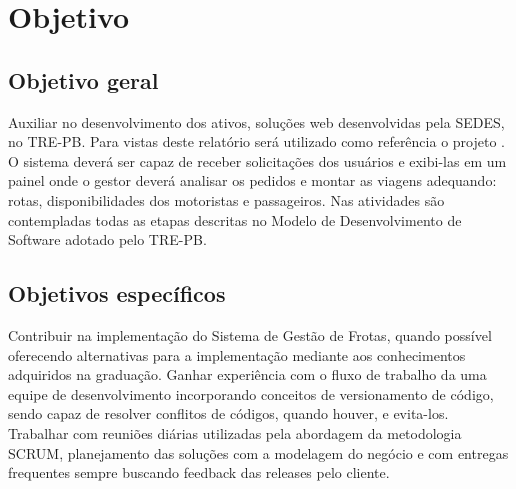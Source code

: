 

\section{Objetivo}
\label{sec:objetivo}

\subsection{Objetivo geral}
\label{sec:objetivoGeral}
Auxiliar no desenvolvimento dos ativos, soluções web desenvolvidas pela SEDES, no TRE-PB.  Para vistas deste relatório será utilizado como referência o projeto \imprimirtitulo. O sistema deverá ser capaz de receber solicitações dos usuários e exibi-las em um painel onde o gestor deverá analisar os pedidos e montar as viagens adequando: rotas, disponibilidades dos motoristas e passageiros. Nas atividades são contempladas todas as etapas descritas no Modelo de Desenvolvimento de Software adotado pelo TRE-PB.

\subsection{Objetivos específicos}
\label{sec:objetivosEspecificos}
Contribuir na implementação do Sistema de Gestão de Frotas, quando possível oferecendo alternativas para a implementação mediante aos conhecimentos adquiridos na graduação. Ganhar experiência com o fluxo de trabalho da uma equipe de desenvolvimento incorporando conceitos de versionamento de código, sendo capaz de resolver conflitos de códigos, quando houver, e evita-los. Trabalhar com reuniões diárias utilizadas pela abordagem da metodologia SCRUM, planejamento das soluções com a modelagem do negócio e com entregas frequentes sempre buscando feedback das releases pelo cliente. 

